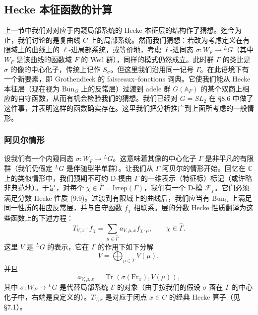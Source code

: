 \documentclass[11pt,a4paper]{article}
\newcommand{\Bun}{\mathrm{Bun}}
\newcommand{\Tr}{\operatorname{Tr}}
\begin{document}

\subsection{Hecke 本征函数的计算}

上一节中我们对对应于内窥局部系统的 Hecke 本征层的结构作了猜想。迄今为止，我们讨论的是复曲线 $C$ 上的局部系统。然而我们猜想：若改为考虑定义在有限域上的曲线上的 $\ell$-进局部系统，或等价地，考虑 $\ell$-进同态 $\sigma: W_F\to{}^{L}G$（其中 $W_F$ 是该曲线的函数域 $F$ 的 Weil 群），同样的模式仍然成立。此时群 $\Gamma$ 的类比是 $\sigma$ 的像的中心化子，传统上记作 $S_\sigma$。但这里我们沿用同一记号 $\Gamma$。在此语境下有一个新要素，即 Grothendieck 的 faisceaux--fonctions 词典。它使我们能从 Hecke 本征层（现在视为 $\Bun_G$ 上的反常层）过渡到 adele 群 $G(\mathbb{A}_F)$ 的某个双商上相应的自守函数，从而有机会检验我们的猜想。我们已经对 $G=SL_2$ 在 §8.6 中做了这件事，并表明这样的函数确实存在。这里我们把分析推广到上面所考虑的一般情形。

\subsubsection{阿贝尔情形}

设我们有一个内窥同态 $\sigma: W_F\to{}^{L}G$。这意味着其像的中心化子 $\Gamma$ 是非平凡的有限群（我们仍假定 ${}^{L}G$ 是伴随型半单群）。让我们从 $\Gamma$ 阿贝尔的情形开始。回忆在 $\mathbb{C}$ 上的类似情形中，我们预期不可约 D-模由 $\Gamma$ 的一维表示（特征标）标记（或许略非典范地）。于是，对每个 $\chi\in\widehat{\Gamma}=\mathrm{Irrep}(\Gamma)$，我们有一个 D-模 $\mathcal{F}_\chi$。它们必须满足分数 Hecke 性质 (9.9)。过渡到有限域上的曲线后，我们应当有 $\Bun_G$ 上满足同一性质的相应反常层，并与自守函数 $f_\chi$ 相联系。层的分数 Hecke 性质翻译为这些函数上的下述方程：
\begin{equation}\tag{9.10}
T_{V,x}\cdot f_\chi = \sum_{\mu\in\widehat{\Gamma}}a_{V,\mu,x}f_{\chi\cdot\mu},
\qquad \chi\in\widehat{\Gamma}.
\end{equation}
这里 $V$ 是 ${}^{L}G$ 的表示，它在 $\Gamma$ 的作用下如下分解
\begin{equation}\tag{9.11}
V = \bigoplus_{\mu\in\widehat{\Gamma}}V(\mu),
\end{equation}
并且
\begin{equation}\tag{9.12}
a_{V,\mu,x} = \Tr(\sigma(\mathrm{Fr}_x),V(\mu)),
\end{equation}
其中 $\sigma: W_F\to{}^{L}G$ 是代替局部系统 $\mathcal{E}$ 的对象（由于按我们的假设 $\sigma$ 落在 $\Gamma$ 的中心化子中，右端是良定义的）。$T_{V,x}$ 是对应于闭点 $x\in C$ 的经典 Hecke 算子（见 §7.1）。
\end{document}
